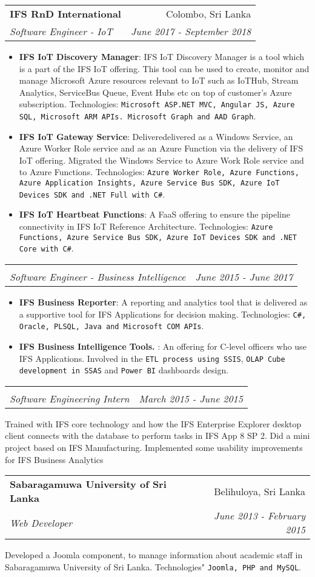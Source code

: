 \documentclass[a4paper,11pt]{article}
\makeatletter
\newcommand{\resumeItem}[2]{
  \item\small{
    \textbf{#1}{: #2 \vspace{-2pt}}
  }
}
\newcommand{\resumeSubheading}[4]{
  \vspace{-1pt}\item
    \begin{tabular*}{0.97\textwidth}{l@{\extracolsep{\fill}}r}
      \textbf{#1} & #2 \\
      \textit{\small#3} & \textit{\small #4} \\
    \end{tabular*}\vspace{-5pt}
}
\newcommand{\resumeItemListStart}{\begin{itemize}}
\newcommand{\resumeItemListEnd}{\end{itemize}\vspace{-5pt}}
\makeatother
\begin{document}
    \resumeSubheading
      {IFS RnD International}{Colombo, Sri Lanka}
      {Software Engineer - IoT}{June 2017 - September 2018}
      \resumeItemListStart
        \resumeItem{IFS IoT Discovery Manager}
          {IFS IoT Discovery Manager is a tool which is a part of the IFS IoT offering. This tool can be used to create, monitor and manage Microsoft Azure resources relevant to IoT such as IoTHub, Stream Analytics, ServiceBus Queue, Event Hubs etc on top of customer's Azure subscription. Technologies: \texttt{Microsoft ASP.NET MVC, Angular JS, Azure SQL, Microsoft ARM APIs. Microsoft Graph and AAD Graph}.}
        \resumeItem{IFS IoT Gateway Service}
          {Deliveredelivered as a Windows Service, an Azure Worker Role service and as an Azure Function via the delivery of IFS IoT offering. Migrated the Windows Service to Azure Work Role service and to Azure Functions. Technologies: \texttt{Azure Worker Role, Azure Functions, Azure Application Insights, Azure Service Bus SDK, Azure IoT Devices SDK and .NET Full with C\#}. }
        \resumeItem{IFS IoT Heartbeat Functions}
          {A FaaS offering to ensure the pipeline connectivity in IFS IoT Reference Architecture. Technologies: \texttt{Azure Functions, Azure Service Bus SDK, Azure IoT Devices SDK and .NET Core with C\#}.}
      \resumeItemListEnd
      
    \resumeSubheading {}{}
      {Software Engineer - Business Intelligence}{June 2015 - June 2017}
      \resumeItemListStart
        \resumeItem{IFS Business Reporter}
          {A reporting and analytics tool that is delivered as a supportive tool for IFS Applications for decision making. Technologies: \texttt{C\#, Oracle, PLSQL, Java and Microsoft COM APIs}. }
        \resumeItem{IFS Business Intelligence Tools. }
          {An offering for C-level officers who use IFS Applications. Involved in the \texttt{ETL process using SSIS}, \texttt{OLAP Cube development in SSAS} and \texttt{Power BI} dashboards design. }
      \resumeItemListEnd  
      
    \resumeSubheading{}{}
      {Software Engineering Intern}{March 2015 - June 2015}
      \resumeItemListStart
        {Trained with IFS core technology and how the IFS Enterprise Explorer desktop client connects with the database to perform tasks in IFS App 8 SP 2. Did a mini project based on IFS Manufacturing. Implemented some usability improvements for IFS Business Analytics}
      \resumeItemListEnd           
      
    \resumeSubheading
      {Sabaragamuwa University of Sri Lanka}{Belihuloya, Sri Lanka}
      {Web Developer}{June 2013 - February 2015}
      \resumeItemListStart
        {Developed a Joomla component, to manage information about academic staff in Sabaragamuwa University of Sri Lanka. Technologies" \texttt{Joomla, PHP and MySQL}.}
      \resumeItemListEnd   
      
\end{document}
